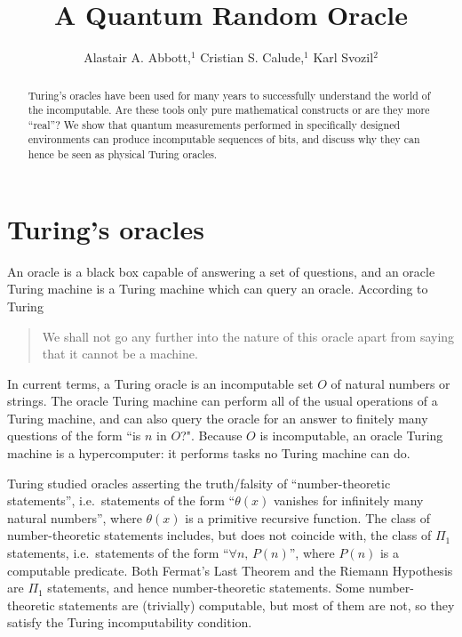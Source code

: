 \documentclass[preprint,11pt]{elsarticle}
\begin{document}
\begin{frontmatter}
\title{A Quantum Random Oracle}
\author{Alastair A. Abbott,$^{1}$  Cristian S. Calude,$^{1}$ Karl Svozil$^{2}$}
\address{
$^{1}$Department of Computer Science,
University of Auckland\\
Private Bag 92019, Auckland,
New Zealand\\
$^{2}$Institut f\"ur Theoretische Physik,
 Vienna University of Technology,  \\  Wiedner Hauptstra\ss e 8-10/136 A-1040 Vienna, Austria
}

\date{}                                           %


\begin{abstract} Turing's oracles have been used for many years to successfully understand the world of the incomputable. Are these tools only pure mathematical constructs or are they more ``real''? We show that quantum measurements performed in specifically designed environments can produce incomputable sequences of bits, and discuss why they can hence be seen as physical Turing oracles.
\end{abstract}
\end{frontmatter}

\section{Turing's oracles}


An oracle is a black box capable of answering a set of questions, and an oracle Turing machine is a Turing machine which can query an oracle. According to Turing~\cite[p.173]{Turing:1939uq}
\begin{quote}
We shall not go any further into the nature of this oracle apart from saying that it cannot be a machine.
\end{quote}

In current terms, a Turing oracle is an incomputable set $O$ of natural numbers or strings.  The oracle Turing machine can perform all of the usual operations of a Turing machine, and can also query the oracle for an answer to finitely many questions of the form ``is $n$ in $O$?". Because $O$ is incomputable, an oracle Turing machine is a  hypercomputer: it performs
tasks no Turing machine can do.


Turing studied oracles asserting the truth/falsity of ``number-theoretic statements'',
i.e.\  statements of the form ``$\theta(x)$ vanishes for infinitely many natural numbers'',
where $\theta(x)$ is a primitive recursive function.
The class of number-theoretic statements includes,
but does not coincide with, the class of  $\Pi_{1}$ statements,
i.e.\ statements of the form ``$\forall n, \, P(n)$'',
where $P(n)$ is a computable predicate. Both Fermat's Last Theorem and the Riemann Hypothesis are $\Pi_{1}$ statements, and hence number-theoretic statements. Some number-theoretic statements are (trivially) computable, but most of them are not, so they satisfy the Turing incomputability condition.
\end{document}
